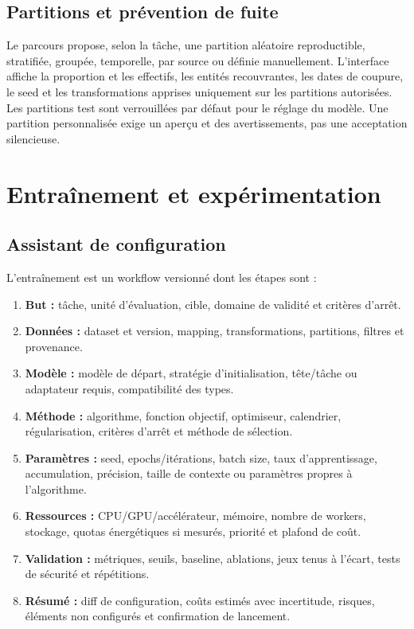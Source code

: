 \documentclass[11pt,a4paper]{article}
\begin{document}
\subsection{Partitions et prévention de fuite}
Le parcours propose, selon la tâche, une partition aléatoire reproductible, stratifiée, groupée, temporelle, par source ou définie manuellement. L'interface affiche la proportion et les effectifs, les entités recouvrantes, les dates de coupure, le seed et les transformations apprises uniquement sur les partitions autorisées. Les partitions test sont verrouillées par défaut pour le réglage du modèle. Une partition personnalisée exige un aperçu et des avertissements, pas une acceptation silencieuse.

\section{Entraînement et expérimentation}
\subsection{Assistant de configuration}
L'entraînement est un workflow versionné dont les étapes sont :
\begin{enumerate}
\item \textbf{But :} tâche, unité d'évaluation, cible, domaine de validité et critères d'arrêt.
\item \textbf{Données :} dataset et version, mapping, transformations, partitions, filtres et provenance.
\item \textbf{Modèle :} modèle de départ, stratégie d'initialisation, tête/tâche ou adaptateur requis, compatibilité des types.
\item \textbf{Méthode :} algorithme, fonction objectif, optimiseur, calendrier, régularisation, critères d'arrêt et méthode de sélection.
\item \textbf{Paramètres :} seed, epochs/itérations, batch size, taux d'apprentissage, accumulation, précision, taille de contexte ou paramètres propres à l'algorithme.
\item \textbf{Ressources :} CPU/GPU/accélérateur, mémoire, nombre de workers, stockage, quotas énergétiques si mesurés, priorité et plafond de coût.
\item \textbf{Validation :} métriques, seuils, baseline, ablations, jeux tenus à l'écart, tests de sécurité et répétitions.
\item \textbf{Résumé :} diff de configuration, coûts estimés avec incertitude, risques, éléments non configurés et confirmation de lancement.
\end{enumerate}
\end{document}
